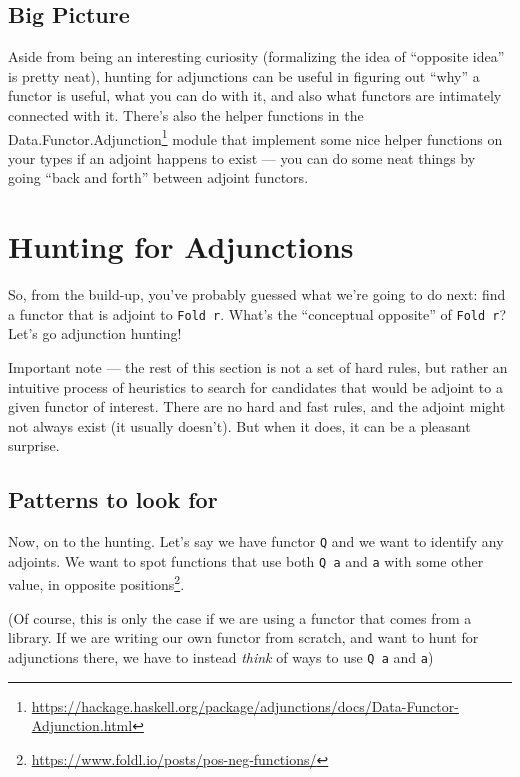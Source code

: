 \documentclass[]{article}
\renewcommand{\href}[2]{#2\footnote{\url{#1}}}
\begin{document}
\subsection{Big Picture}\label{big-picture}

Aside from being an interesting curiosity (formalizing the idea of ``opposite
idea'' is pretty neat), hunting for adjunctions can be useful in figuring out
``why'' a functor is useful, what you can do with it, and also what functors are
intimately connected with it. There's also the helper functions in the
\href{https://hackage.haskell.org/package/adjunctions/docs/Data-Functor-Adjunction.html}{Data.Functor.Adjunction}
module that implement some nice helper functions on your types if an adjoint
happens to exist --- you can do some neat things by going ``back and forth''
between adjoint functors.

\section{Hunting for Adjunctions}\label{hunting-for-adjunctions}

So, from the build-up, you've probably guessed what we're going to do next: find
a functor that is adjoint to \texttt{Fold\ r}. What's the ``conceptual
opposite'' of \texttt{Fold\ r}? Let's go adjunction hunting!

Important note --- the rest of this section is not a set of hard rules, but
rather an intuitive process of heuristics to search for candidates that would be
adjoint to a given functor of interest. There are no hard and fast rules, and
the adjoint might not always exist (it usually doesn't). But when it does, it
can be a pleasant surprise.

\subsection{Patterns to look for}\label{patterns-to-look-for}

Now, on to the hunting. Let's say we have functor \texttt{Q} and we want to
identify any adjoints. We want to spot functions that use both \texttt{Q\ a} and
\texttt{a} with some other value, in
\href{https://www.foldl.io/posts/pos-neg-functions/}{opposite positions}.

(Of course, this is only the case if we are using a functor that comes from a
library. If we are writing our own functor from scratch, and want to hunt for
adjunctions there, we have to instead \emph{think} of ways to use \texttt{Q\ a}
and \texttt{a})
\end{document}
